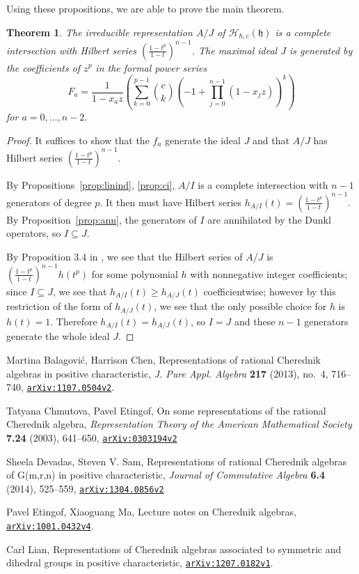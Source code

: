 \documentclass{article}
\numberwithin{equation}{section}
\newtheorem{theorem}[equation]{Theorem}
\newcommand{\h}{\mathfrak{h}}
\newcommand{\HH}{\mathcal{H}}
\newcommand{\arxiv}[1]{\href{http://arxiv.org/abs/#1}{{\tt arXiv:#1}}}
\begin{document}
Using these propositions, we are able to prove the main theorem.

\begin{theorem}\label{thm:main} The irreducible representation $A/J$  of $\HH_{\hbar,c}(\h)$ is a complete intersection with  Hilbert series $\left(\frac{1-t^p}{1-t}\right)^{n-1}$. The maximal ideal $J$ is generated by the coefficients of $z^p$ in the formal power series \\
$$F_a=\frac{1}{1-x_az} \left( \sum_{k=0}^{p-1} \binom{c}{k}(-1+\prod_{j=0}^{n-1} (1-x_jz))^k\right)$$ for $a=0,\dots,n-2$. \end{theorem} 

\begin{proof} It suffices to show that the $f_a$ generate the ideal $J$ and that $A/J$ has Hilbert series $\left(\frac{1-t^p}{1-t}\right)^{n-1}$. 

By Propositions~\ref{prop:linind}, \ref{prop:ci}, $A/I$ is a complete intersection with $n-1$ generators of degree $p$. It then must have Hilbert series $h_{A/I}(t)=\left(\frac{1-t^p}{1-t}\right)^{n-1}$. By Proposition~\ref{prop:ann}, the generators of $I$ are annihilated by the Dunkl operators, so $I \subseteq J$.

By Proposition 3.4 in \cite{BC1}, we see that the Hilbert series of $A/J$ is $\left(\frac{1-t^p}{1-t}\right)^{n-1}h(t^p)$ for some polynomial $h$ with nonnegative integer coefficients; since $I \subseteq J$, we see that $h_{A/I}(t) \ge h_{A/J}(t)$ coefficientwise; however by this restriction of the form of $h_{A/J}(t)$, we see that the only possible choice for $h$ is $h(t)=1$. Therefore $h_{A/I}(t)=h_{A/J}(t)$, so $I=J$ and these $n-1$ generators generate the whole ideal $J$.

\end{proof}








\begin{thebibliography}{2}

\setlength{\itemsep}{-1mm}
\small

 Martina Balagovi\'c, Harrison Chen, Representations of rational Cherednik algebras in positive characteristic, {\it J. Pure Appl. Algebra} {\bf 217} (2013), no.~4, 716--740, \arxiv{1107.0504v2}.

 Tatyana Chmutova, Pavel Etingof, On some representations of the rational Cherednik algebra, {\it Representation Theory of the American Mathematical Society} {\bf 7.24} (2003), 641--650, \arxiv{0303194v2}

 Sheela Devadas, Steven V. Sam, Representations of rational Cherednik algebras of G(m,r,n) in positive characteristic, {\it Journal of Commutative Algebra} {\bf 6.4} (2014), 525--559, \arxiv{1304.0856v2}

 Pavel Etingof, Xiaoguang Ma, Lecture notes on Cherednik algebras, \arxiv{1001.0432v4}.

 Carl Lian, Representations of Cherednik algebras associated to symmetric and dihedral groups in positive characteristic, \arxiv{1207.0182v1}.

\end{thebibliography}
\end{document}
